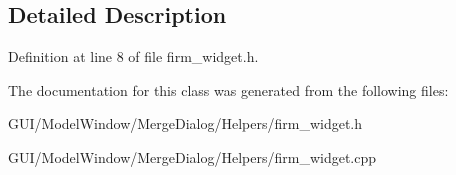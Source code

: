 \subsection{Detailed Description}


Definition at line 8 of file firm\+\_\+widget.\+h.



The documentation for this class was generated from the following files\+:\begin{DoxyCompactItemize}
\item 
G\+U\+I/\+Model\+Window/\+Merge\+Dialog/\+Helpers/firm\+\_\+widget.\+h\item 
G\+U\+I/\+Model\+Window/\+Merge\+Dialog/\+Helpers/firm\+\_\+widget.\+cpp\end{DoxyCompactItemize}
